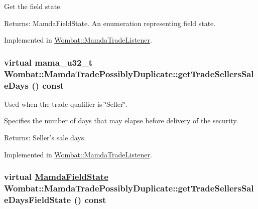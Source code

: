 Get the field state. 

\begin{Desc}
\item[Returns:]Mamda\-Field\-State. An enumeration representing field state. \end{Desc}


Implemented in \hyperlink{classWombat_1_1MamdaTradeListener_2e60dd06819139125a4812e84d5803c0}{Wombat::Mamda\-Trade\-Listener}.\hypertarget{classWombat_1_1MamdaTradePossiblyDuplicate_96cd3f338219a7dd5c9cb3d7b761296d}{
\subsubsection[getTradeSellersSaleDays]{\setlength{\rightskip}{0pt plus 5cm}virtual mama\_\-u32\_\-t Wombat::Mamda\-Trade\-Possibly\-Duplicate::get\-Trade\-Sellers\-Sale\-Days () const}}
\label{classWombat_1_1MamdaTradePossiblyDuplicate_96cd3f338219a7dd5c9cb3d7b761296d}


Used when the trade qualifier is \char`\"{}Seller\char`\"{}. 

Specifies the number of days that may elapse before delivery of the security.

\begin{Desc}
\item[Returns:]Seller's sale days. \end{Desc}


Implemented in \hyperlink{classWombat_1_1MamdaTradeListener_719ed8fafd8f299b274ba2f11981b3ba}{Wombat::Mamda\-Trade\-Listener}.\hypertarget{classWombat_1_1MamdaTradePossiblyDuplicate_dadaa92d7ee001dd310ba0bb411011e8}{
\subsubsection[getTradeSellersSaleDaysFieldState]{\setlength{\rightskip}{0pt plus 5cm}virtual \hyperlink{namespaceWombat_93aac974f2ab713554fd12a1fa3b7d2a}{Mamda\-Field\-State} Wombat::Mamda\-Trade\-Possibly\-Duplicate::get\-Trade\-Sellers\-Sale\-Days\-Field\-State () const}}
\label{classWombat_1_1MamdaTradePossiblyDuplicate_dadaa92d7ee001dd310ba0bb411011e8}


